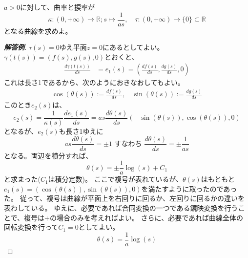 \begin{example}[対数螺旋]
  $a>0$に対して、曲率と捩率が
  \[\kappa:(0,+\infty)\to\mathbb{R};s\mapsto\frac1{as},\quad \tau:(0,+\infty)\to\{0\}\subset\mathbb{R}\]
  となる曲線を求めよ。
\end{example}
\begin{proof}[\textbf{解答例}]
  $\tau(s)=0$ゆえ平面$z=0$にあるとしてよい。
  $\gamma(t(s))=(f(s),g(s),0)$とおくと、
  \begin{align*}
    \frac{d\gamma(t(s))}{ds}&=e_1(s)=\left(\frac{df(s)}{ds},\frac{dg(s)}{ds},0\right)
  \end{align*}
  これは長さ1であるから、次のようにおきなおしてもよい。
  \begin{align*}
    \cos(\theta(s)):=\frac{df(s)}{ds},\quad\sin(\theta(s)):=\frac{dg(s)}{ds}
  \end{align*}
  このとき$e_2(s)$は、
  \[
    e_2(s)=\frac1{\kappa(s)}\frac{de_1(s)}{ds}=as\frac{d\theta(s)}{ds}(-\sin(\theta(s)),\cos(\theta(s)),0)
  \]
  となるが、$e_2(s)$も長さ1ゆえに
  \[
    as\frac{d\theta(s)}{ds}=\pm1 \text{ すなわち } \frac{d\theta(s)}{ds}=\pm\frac{1}{as}
  \]
  となる。両辺を積分すれば、
  \[
    \theta(s)=\pm\frac1a\log(s)+C_1
  \]
  と求まった($C_1$は積分定数)。
  ここで複号が表れているが、$\theta(s)$はもともと$e_1(s)=(\cos(\theta(s)),\sin(\theta(s)),0)$を満たすように取ったのであった。
  従って、複号は曲線が平面上を右回りに回るか、左回りに回るかの違いを表わしている。
  ゆえに、必要であれば合同変換の一つである鏡映変換を行うことで、複号は$+$の場合のみを考えればよい。
  さらに、必要であれば曲線全体の回転変換を行って$C_1=0$としてよい。
  \[
    \theta(s)=\frac1a\log(s)
  \]


\end{proof}
